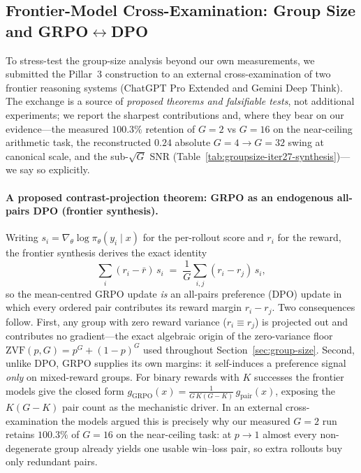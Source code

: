 \documentclass{article}
\begin{document}
 

\subsection{Frontier-Model Cross-Examination: Group Size and GRPO$\leftrightarrow$DPO}
\label{sec:frontier-group-size}

To stress-test the group-size analysis beyond our own measurements, we
submitted the Pillar~3 construction to an external cross-examination of
two frontier reasoning systems (ChatGPT Pro Extended and Gemini Deep
Think). The exchange is a source of \emph{proposed theorems and
falsifiable tests}, not additional experiments; we report the sharpest
contributions and, where they bear on our evidence---the measured
$100.3\%$ retention of $G{=}2$ vs $G{=}16$ on the near-ceiling
arithmetic task, the reconstructed $0.24$ absolute $G{=}4\!\to\!G{=}32$ swing at
canonical scale, and the sub-$\sqrt{G}$ SNR
(Table~\ref{tab:groupsize-iter27-synthesis})---we say so explicitly.

\paragraph{A proposed contrast-projection theorem: GRPO as an endogenous all-pairs DPO (frontier synthesis).}
Writing $s_i = \nabla_\theta \log \pi_\theta(y_i \mid x)$ for the
per-rollout score and $r_i$ for the reward, the frontier synthesis
derives the exact identity
\begin{equation}
  \sum_{i}(r_i - \bar r)\, s_i \;=\; \frac{1}{G}\sum_{i,j}(r_i - r_j)\, s_i,
  \label{eq:fs-contrast}
\end{equation}
so the mean-centred GRPO update \emph{is} an all-pairs preference (DPO)
update in which every ordered pair contributes its reward margin
$r_i-r_j$. Two consequences follow. First, any group with zero reward
variance ($r_i \equiv r_j$) is projected out and contributes no
gradient---the exact algebraic origin of the zero-variance floor
$\mathrm{ZVF}(p,G)=p^G+(1-p)^G$ used throughout
Section~\ref{sec:group-size}. Second, unlike DPO, GRPO supplies its own
margins: it self-induces a preference signal \emph{only} on
mixed-reward groups. For binary rewards with $K$ successes the frontier
models give the closed form
$g_\text{GRPO}(x) = \tfrac{1}{G\,K(G-K)}\, g_\text{pair}(x)$, exposing
the $K(G-K)$ pair count as the mechanistic driver. In an external
cross-examination the models argued this is precisely why our measured
$G{=}2$ run retains $100.3\%$ of $G{=}16$ on the near-ceiling task: at
$p\!\to\!1$ almost every non-degenerate group already yields one usable
win--loss pair, so extra rollouts buy only redundant pairs.
\end{document}

